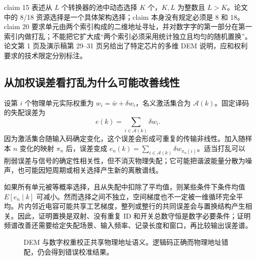 claim 15 表述从 \(L\) 个转换器的池中动态选择 \(K\) 个，\(K,L\) 为整数且 \(L>K\)。论文中的 8/18 资源选择是一个具体架构选择；claim 本身没有规定必须是 8 和 18。claim 20 要求单元由两个索引构成的二维地址寻址，并对数字字的第一部分在第一索引内做打乱；不能把它扩大成“两个索引必须采用统计独立且均匀的随机置换”。论文第 1 页及演示稿第 29--31 页另给出了特定芯片的多维 DEM 说明，应和权利要求的技术限定分别标注。

\subsection{从加权误差看打乱为什么可能改善线性}
设第 \(i\) 个物理单元实际权重为 \(w_i=\bar w+\delta w_i\)，名义激活集合为 \(\mathcal A(k)\)。固定译码的失配误差为
\begin{equation}
e(k)=\sum_{i\in\mathcal A(k)}\delta w_i.
\end{equation}
因为激活集合随输入码确定变化，这个误差会形成可重复的传输非线性。加入随样本 \(n\) 变化的映射 \(\pi_n\) 后，误差变成 \(e_n(k)=\sum_{i\in\mathcal A(k)}\delta w_{\pi_n(i)}\)。适当打乱可以削弱误差与信号的确定性相关性，但不消灭物理失配；它可能把谐波能量分散为噪声，也可能因短周期或相关选择产生新的离散谱线。

如果所有单元被等概率选择，且从失配中扣除了平均值，则某些条件下条件均值 \(E[e_n\mid k]\) 可减小。然而选择之间不独立，空间梯度也不一定被一维循环完全平均。片内邻近电容可能共享工艺梯度，整列或整行的共同误差会与置换结构产生相关。因此，证明置换是双射、没有重复 ID 和开关总数守恒是数字必要条件；证明频谱改善还需要给定失配场景、输入频率、记录长度和窗口，再比较输出误差谱。

\begin{figure}[htbp]\centering
{}
\caption{DEM 与数字权重校正共享物理地址语义。逻辑码正确而物理地址错配，仍会得到错误校准结果。}
\end{figure}


